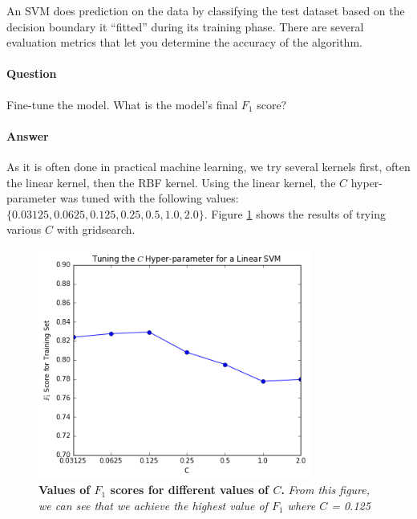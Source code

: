 \documentclass[12pt]{article}
\begin{document}
An SVM does prediction on the data by classifying the test dataset based on the decision boundary it ``fitted'' during its training phase. There are several evaluation metrics that let you determine the accuracy of the algorithm.


\paragraph{\textbf{Question}} Fine-tune the model. What is the model's final $F_1$ score?
\paragraph{\textbf{Answer}} As it is often done in practical machine learning, we try several kernels first, often the linear kernel, then the RBF kernel. Using the linear kernel, the $C$ hyper-parameter was tuned with the following values: $ \{0.03125, 0.0625, 0.125 , 0.25, 0.5, 1.0, 2.0 \}$. Figure \ref{tunedC} shows the results of trying various $C$ with gridsearch. 


\begin{figure}[!htbp]
  \centering
    \includegraphics[width=0.8\textwidth]{images/C_Hyperparameter}
\caption{\textbf{Values of $F_1$ scores for different values of $C$.} \textit{From this figure, we can see that we achieve the highest value of $F_1$ where $C$ = 0.125}}
\label{tunedC}
\end{figure}
\end{document}
